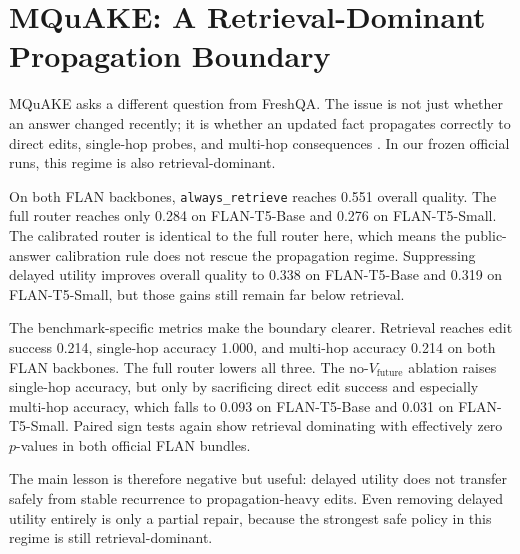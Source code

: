 \section{MQuAKE: A Retrieval-Dominant Propagation Boundary}

MQuAKE asks a different question from FreshQA. The issue is not just whether an answer changed recently; it is whether an updated fact propagates correctly to direct edits, single-hop probes, and multi-hop consequences \citep{zhong2023mquake}. In our frozen official runs, this regime is also retrieval-dominant.

\begin{table}[h]
\centering
\small

\caption{Official MQuAKE results. Retrieval remains strongest on overall quality, direct edit success, and multi-hop consequences. Suppressing delayed utility improves on the full router but still does not overtake retrieval.}
\label{tab:mquake-main}
\end{table}

On both FLAN backbones, \texttt{always\_retrieve} reaches 0.551 overall quality. The full router reaches only 0.284 on FLAN-T5-Base and 0.276 on FLAN-T5-Small. The calibrated router is identical to the full router here, which means the public-answer calibration rule does not rescue the propagation regime. Suppressing delayed utility improves overall quality to 0.338 on FLAN-T5-Base and 0.319 on FLAN-T5-Small, but those gains still remain far below retrieval.

The benchmark-specific metrics make the boundary clearer. Retrieval reaches edit success 0.214, single-hop accuracy 1.000, and multi-hop accuracy 0.214 on both FLAN backbones. The full router lowers all three. The no-\(V_{\text{future}}\) ablation raises single-hop accuracy, but only by sacrificing direct edit success and especially multi-hop accuracy, which falls to 0.093 on FLAN-T5-Base and 0.031 on FLAN-T5-Small. Paired sign tests again show retrieval dominating with effectively zero \(p\)-values in both official FLAN bundles.

The main lesson is therefore negative but useful: delayed utility does not transfer safely from stable recurrence to propagation-heavy edits. Even removing delayed utility entirely is only a partial repair, because the strongest safe policy in this regime is still retrieval-dominant.
